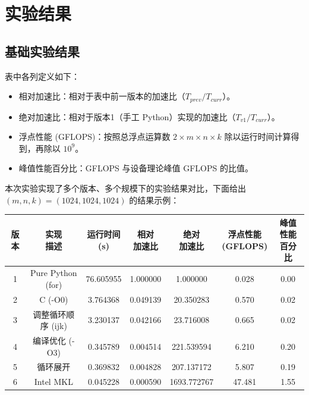 \documentclass{SYSUReport}
\begin{document}
\section{实验结果}
\subsection{基础实验结果}
表中各列定义如下：
\begin{itemize}
    \item 相对加速比：相对于表中前一版本的加速比（$T_{prev}/T_{curr}$）。
    \item 绝对加速比：相对于版本1（手工 Python）实现的加速比（$T_{v1}/T_{curr}$）。
    \item 浮点性能 (GFLOPS)：按照总浮点运算数 $2\times m\times n\times k$ 除以运行时间计算得到，再除以 $10^9$。
    \item 峰值性能百分比：GFLOPS 与设备理论峰值 GFLOPS 的比值。
\end{itemize}

本次实验实现了多个版本、多个规模下的实验结果对比，下面给出 $(m,n,k)=(1024,1024,1024)$ 的结果示例：
\begin{table}[h]
    \centering
    \small
    \begin{tabular}{|c|c|c|c|c|c|c|}
        \hline
        版本 & \shortstack{实现\\描述} & \shortstack{运行时间\\ (s)} & \shortstack{相对\\加速比} & \shortstack{绝对\\加速比} & \shortstack{浮点性能\\ (GFLOPS)} & \shortstack{峰值性能\\百分比} \\
        \hline
        1 & Pure Python (for) & 76.605955 & 1.000000 & 1.000000 & 0.028 & 0.00 \\
        \hline
        2 & C (-O0) & 3.764368 & 0.049139 & 20.350283 & 0.570 & 0.02 \\
        \hline
        3 & 调整循环顺序 (ijk) & 3.230137 & 0.042166 & 23.716008 & 0.665 & 0.02 \\
        \hline
        4 & 编译优化 (-O3) & 0.345789 & 0.004514 & 221.539594 & 6.210 & 0.20 \\
        \hline
        5 & 循环展开 & 0.369832 & 0.004828 & 207.137172 & 5.807 & 0.19 \\
        \hline
        6 & Intel MKL & 0.045228 & 0.000590 & 1693.772767 & 47.481 & 1.55 \\
        \hline
    \end{tabular}
\end{table}
\end{document}
